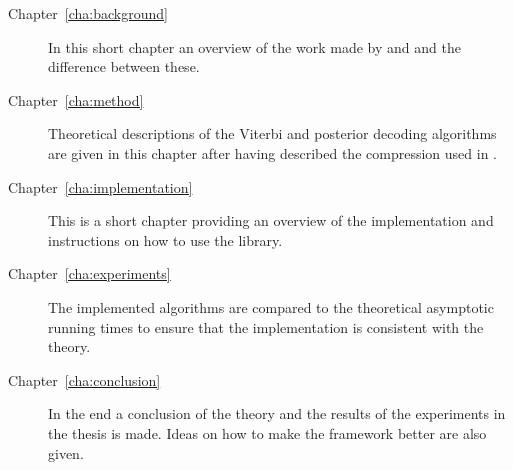 \begin{description}
\item[Chapter~\ref{cha:background}] In this short chapter an overview of
  the work made by \citet{lifshits2009speeding} and \citet{sand2013ziphmmlib}
  and the difference between these.
\item[Chapter~\ref{cha:method}] Theoretical descriptions of the Viterbi and
  posterior decoding algorithms are given in this chapter after having
  described the compression used in \citet{sand2013ziphmmlib}.
\item[Chapter~\ref{cha:implementation}] This is a short chapter providing an
  overview of the implementation and instructions on how to use the library.
\item[Chapter~\ref{cha:experiments}] The implemented algorithms are compared to
  the theoretical asymptotic running times to ensure that the implementation
  is consistent with the theory.
\item[Chapter~\ref{cha:conclusion}] In the end a conclusion of the theory and
  the results of the experiments in the thesis is made. Ideas on how to
  make the framework better are also given.
\end{description}

